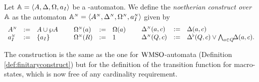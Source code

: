 \begin{definition}\label{def:noetherianconstruct}
Let $\mathbb{A} = \langle{A,\Delta,\Omega,a_I}\rangle$ be a {\nmso-automaton}.
We define the \emph{noetherian construct over $\mathbb{A}$} as the automaton
$\mathbb{A}^{{\scriptscriptstyle N}} = \langle{A^{{\scriptscriptstyle N}},\Delta^{{\scriptscriptstyle N}},\Omega^{{\scriptscriptstyle N}},a_I^{{\scriptscriptstyle N}}}\rangle$ given
by
\[
\begin{array}{lll}
   A^{\noet}   &\df&  A \cup \shA
\\ a_I^{\noet} &\df&  \{a_I\}
\end{array}
%
\hspace*{5mm}
%
\begin{array}{lll}
   \pmap^{\noet}(a) &\df& \pmap(a)
\\ \pmap^{\noet}(R) &\df& 1
\end{array}
%
\hspace*{5mm}
%
\begin{array}{lll}
   \tmap^{\noet}(a,c) &\df& \tmap(a,c)
\\ \tmap^{\noet}(Q,c) &\df&
  \bmDe(Q,c) \vee \bigwedge_{a \in Q} \! \! \tmap(a,c).
\end{array}
\]
\end{definition}

The construction is the same as the one for $\mathrm{WMSO}$-automata (Definition \ref{def:finitaryconstruct}) but for the definition of the transition function for macro-states, which is now free of any cardinality requirement. %

